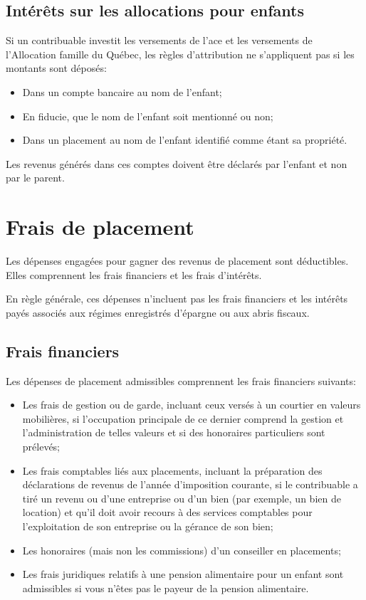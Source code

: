 \subsection{Intérêts sur les allocations pour enfants}
\label{interetsSurLesAllocationsPourEnfants}
Si un contribuable investit les versements de l'\acrfull{ace} et les versements de l'Allocation famille du Québec, les règles d'attribution ne s'appliquent pas si les montants sont déposés:
\begin{itemize}
	\item Dans un compte bancaire au nom de l'enfant;
	\item En fiducie, que le nom de l'enfant soit mentionné ou non;
	\item Dans un placement au nom de l'enfant identifié comme étant sa propriété.
\end{itemize}

Les revenus générés dans ces comptes doivent être déclarés par l'enfant et non par le parent.



\section{Frais de placement}
\begin{intro}
	Les dépenses engagées pour gagner des revenus de placement sont déductibles. Elles comprennent les frais financiers et les frais d'intérêts.
	
	En règle générale, ces dépenses n'incluent pas les frais financiers et les intérêts payés associés aux régimes enregistrés d'épargne ou aux abris fiscaux.
\end{intro}


\subsection{Frais financiers}
\label{fraisDePlacementFraisFinanciers}
Les dépenses de placement admissibles comprennent les frais financiers suivants:
\begin{itemize}
	\item Les frais de gestion ou de garde, incluant ceux versés à un courtier en valeurs mobilières, si l'occupation principale de ce dernier comprend la gestion et l'administration de telles valeurs et si des honoraires particuliers sont prélevés;
	\item Les frais comptables liés aux placements, incluant la préparation des déclarations de revenus de l'année d'imposition courante, si le contribuable a tiré un revenu ou d'une entreprise ou d'un bien (par exemple, un bien de location) et qu'il doit avoir recours à des services comptables pour l'exploitation de son entreprise ou la gérance de son bien;
	\item Les honoraires (mais non les commissions) d'un conseiller en placements; 
	\item Les frais juridiques relatifs à une pension alimentaire pour un enfant sont admissibles si vous n'êtes pas le payeur de la pension alimentaire.
\end{itemize}

